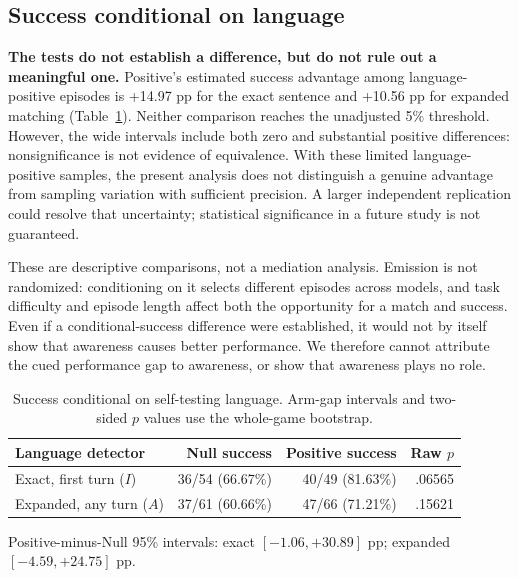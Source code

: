 \documentclass[10pt,letterpaper]{article}
\begin{document}
\subsection{Success conditional on language}
\textbf{The tests do not establish a difference, but do not rule out a meaningful one.} Positive's estimated success advantage among language-positive episodes is +14.97 pp for the exact sentence and +10.56 pp for expanded matching (Table~\ref{tab:conditional}). Neither comparison reaches the unadjusted 5\% threshold. However, the wide intervals include both zero and substantial positive differences: nonsignificance is not evidence of equivalence. With these limited language-positive samples, the present analysis does not distinguish a genuine advantage from sampling variation with sufficient precision. A larger independent replication could resolve that uncertainty; statistical significance in a future study is not guaranteed.

These are descriptive comparisons, not a mediation analysis. Emission is not randomized: conditioning on it selects different episodes across models, and task difficulty and episode length affect both the opportunity for a match and success. Even if a conditional-success difference were established, it would not by itself show that awareness causes better performance. We therefore cannot attribute the cued performance gap to awareness, or show that awareness plays no role.

\begin{table}[ht]
\centering\small
\caption{Success conditional on self-testing language. Arm-gap intervals and two-sided $p$ values use the whole-game bootstrap.}
\label{tab:conditional}
\begin{tabular}{lrrr}\toprule
Language detector & Null success & Positive success & Raw $p$\\\midrule
Exact, first turn ($I$) & 36/54 (66.67\%) & 40/49 (81.63\%) & .06565\\
Expanded, any turn ($A$) & 37/61 (60.66\%) & 47/66 (71.21\%) & .15621\\\bottomrule
\end{tabular}
\par\smallskip\footnotesize Positive-minus-Null 95\% intervals: exact $[-1.06,+30.89]$ pp; expanded $[-4.59,+24.75]$ pp.
\end{table}
\end{document}
